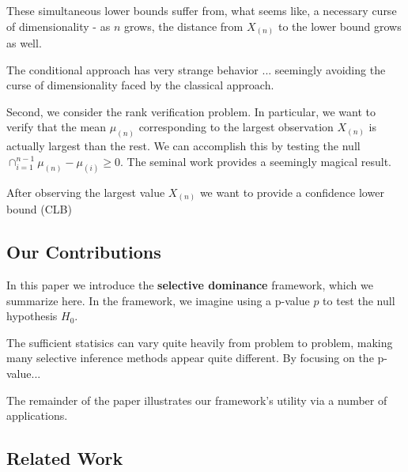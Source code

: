 \documentclass{article}
\begin{document}
These simultaneous lower bounds suffer from, what seems like, a necessary curse of dimensionality - as $n$ grows, the distance from $X_{(n)}$ to the lower bound grows as well. 

The conditional approach has very strange behavior ... seemingly avoiding the curse of dimensionality faced by the classical approach. 


Second, we consider the rank verification problem. In particular, we want to verify that the mean $\mu_{(n)}$ corresponding to the largest observation $X_{(n)}$ is actually largest than the rest. We can accomplish this by testing the null $\cap_{i=1}^{n-1} \mu_{(n)} - \mu_{(i)} \geq 0$. The seminal work \cite{Hung2019} provides a seemingly magical result.  

After observing the largest value $X_{(n)}$ we want to provide a confidence lower bound (CLB) 



\subsection{Our Contributions}

In this paper we introduce the \textbf{selective dominance} framework, which we summarize here. In the framework, we imagine using a p-value $p$ to test the null hypothesis $H_0$. 


The sufficient statisics can vary quite heavily from problem to problem, making many selective inference methods appear quite different. By focusing on the p-value... 

The remainder of the paper illustrates our framework's utility via a number of applications. 





\subsection{Related Work}
\end{document}
